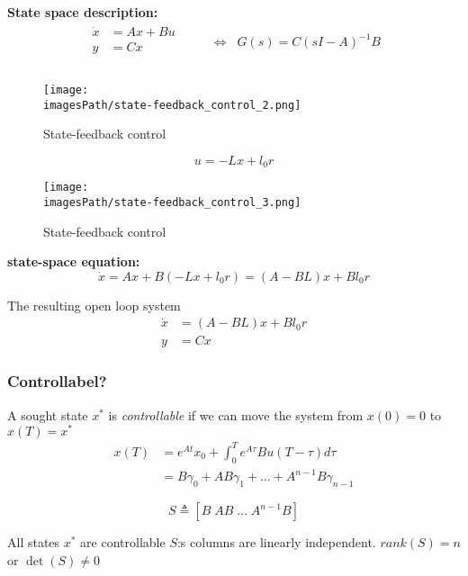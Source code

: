\textbf{State space description:}
\begin{align*}
    \begin{aligned}
        \dot{x} &= Ax + Bu \\
        y &= Cx \\
    \end{aligned}&
    && \Leftrightarrow \;\; G(s) = C(sI-A)^{-1}B \\
\end{align*}
\begin{figure}[!h]
    \centering
    \texttt{[image: \\imagesPath/state-feedback\_control\_2.png]}
    \caption{State-feedback control}
\end{figure}

\begin{equation*}
    u = -Lx + l_0 r
\end{equation*}
\begin{figure}[!h]
    \centering
    \texttt{[image: \\imagesPath/state-feedback\_control\_3.png]}
    \caption{State-feedback control}
\end{figure}

\textbf{state-space equation:}
\begin{equation*}
    \dot{x} = Ax + B(-Lx+l_0r) = (A-BL)x + Bl_0r
\end{equation*}

The resulting open loop system
\begin{align*}
    \dot{x} &= (A-BL)x + Bl_0r \\
    y &= Cx
\end{align*}

\subsubsection{Controllabel?}
A sought state $x^*$ is \textit{controllable} if we can move the system from $x(0)=0$
to $x(T) = x^*$
\begin{align*}
    x(T) &= e^{At}x_0 + \int_0^T e^{A\tau}Bu(T-\tau)d\tau \\ 
    &= B\gamma_0 + AB\gamma_1 + \ldots + A^{n-1}B\gamma_{n-1}
\end{align*}

\begin{equation*}
    S \triangleq [B \; AB \; \ldots \; A^{n-1}B]
\end{equation*}

All states $x^*$ are controllable $S$:s columns are linearly independent.
$rank(S) = n$ or $\det(S) \neq 0$

